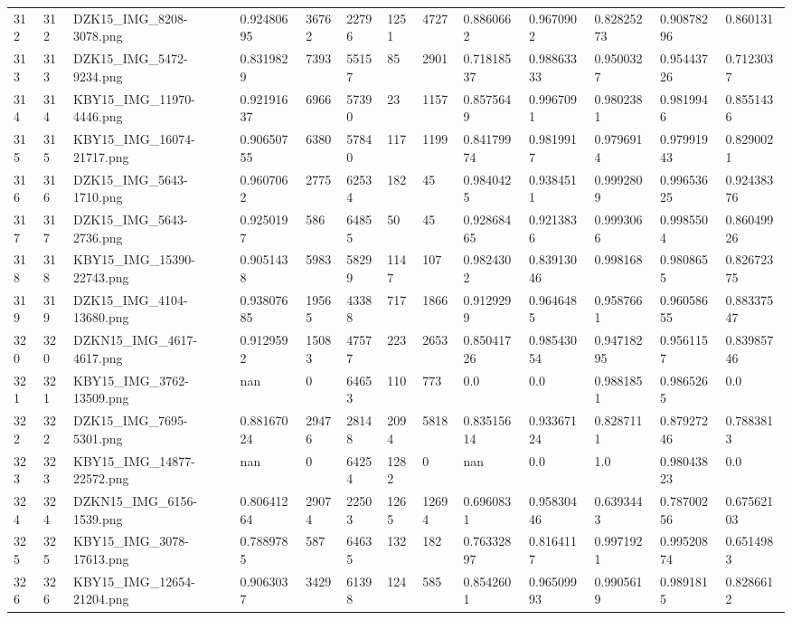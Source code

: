 \documentclass[11pt, a4paper, twoside]{report}
\begin{document}
\begin{longtable}[c]{@{}lllllllllllll@{}}
312 & 312 & DZK15\_IMG\_8208-3078.png & 0.92480695 & 36762 & 22796 & 1251 & 4727 & 0.8860662 & 0.9670902 & 0.82825273 & 0.90878296 & 0.860131 \\
313 & 313 & DZK15\_IMG\_5472-9234.png & 0.8319829 & 7393 & 55157 & 85 & 2901 & 0.71818537 & 0.98863333 & 0.9500327 & 0.95443726 & 0.7123037 \\
314 & 314 & KBY15\_IMG\_11970-4446.png & 0.92191637 & 6966 & 57390 & 23 & 1157 & 0.8575649 & 0.9967091 & 0.9802381 & 0.9819946 & 0.8551436 \\
315 & 315 & KBY15\_IMG\_16074-21717.png & 0.90650755 & 6380 & 57840 & 117 & 1199 & 0.84179974 & 0.9819917 & 0.9796914 & 0.97991943 & 0.8290021 \\
316 & 316 & DZK15\_IMG\_5643-1710.png & 0.9607062 & 2775 & 62534 & 182 & 45 & 0.9840425 & 0.9384511 & 0.9992809 & 0.99653625 & 0.92438376 \\
317 & 317 & DZK15\_IMG\_5643-2736.png & 0.9250197 & 586 & 64855 & 50 & 45 & 0.92868465 & 0.9213836 & 0.9993066 & 0.9985504 & 0.86049926 \\
318 & 318 & KBY15\_IMG\_15390-22743.png & 0.9051438 & 5983 & 58299 & 1147 & 107 & 0.9824302 & 0.83913046 & 0.998168 & 0.9808655 & 0.82672375 \\
319 & 319 & DZK15\_IMG\_4104-13680.png & 0.93807685 & 19565 & 43388 & 717 & 1866 & 0.9129299 & 0.9646485 & 0.9587661 & 0.96058655 & 0.88337547 \\
320 & 320 & DZKN15\_IMG\_4617-4617.png & 0.9129592 & 15083 & 47577 & 223 & 2653 & 0.85041726 & 0.98543054 & 0.94718295 & 0.9561157 & 0.83985746 \\
321 & 321 & KBY15\_IMG\_3762-13509.png & nan & 0 & 64653 & 110 & 773 & 0.0 & 0.0 & 0.9881851 & 0.9865265 & 0.0 \\
322 & 322 & DZK15\_IMG\_7695-5301.png & 0.88167024 & 29476 & 28148 & 2094 & 5818 & 0.83515614 & 0.93367124 & 0.8287111 & 0.87927246 & 0.7883813 \\
323 & 323 & KBY15\_IMG\_14877-22572.png & nan & 0 & 64254 & 1282 & 0 & nan & 0.0 & 1.0 & 0.98043823 & 0.0 \\
324 & 324 & DZKN15\_IMG\_6156-1539.png & 0.80641264 & 29074 & 22503 & 1265 & 12694 & 0.6960831 & 0.95830446 & 0.6393443 & 0.78700256 & 0.67562103 \\
325 & 325 & KBY15\_IMG\_3078-17613.png & 0.7889785 & 587 & 64635 & 132 & 182 & 0.76332897 & 0.8164117 & 0.9971921 & 0.99520874 & 0.6514983 \\
326 & 326 & KBY15\_IMG\_12654-21204.png & 0.9063037 & 3429 & 61398 & 124 & 585 & 0.8542601 & 0.96509993 & 0.9905619 & 0.9891815 & 0.8286612 \\

\end{longtable}
\end{document}
